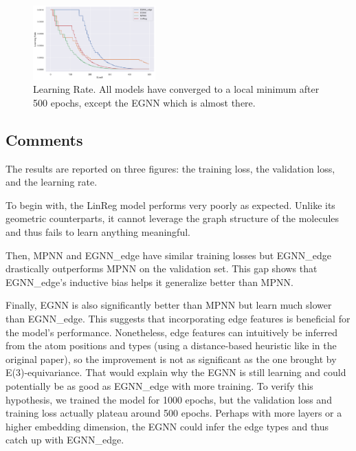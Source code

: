 \documentclass[sigconf]{acmart}
\begin{document}
\begin{figure}
    \centering
    \includegraphics[width=0.42\textwidth]{figures/learning_rate.png}
    \caption{Learning Rate. All models have converged to a local minimum after 500 epochs, except the EGNN which is almost there.}
    \label{fig:learning-rate}
\end{figure}

\subsection{Comments}
The results are reported on three figures: the training loss, the validation loss, and the learning rate.

To begin with, the LinReg model performs very poorly as expected. Unlike its geometric counterparts, it cannot leverage the graph structure of the molecules and thus fails to learn anything meaningful.

Then, MPNN and EGNN\_edge have similar training losses but EGNN\_edge drastically outperforms MPNN on the validation set. This gap shows that EGNN\_edge's inductive bias helps it generalize better than MPNN.

Finally, EGNN is also significantly better than MPNN but learn much slower than EGNN\_edge. This suggests that incorporating edge features is beneficial for the model's performance.
Nonetheless, edge features can intuitively be inferred from the atom positions and types (using a distance-based heuristic like in the original paper), so the improvement is not as significant as the one brought by E(3)-equivariance.
That would explain why the EGNN is still learning and could potentially be as good as EGNN\_edge with more training. To verify this hypothesis, we trained the model for 1000 epochs, but the validation loss and training loss actually plateau around 500 epochs.
Perhaps with more layers or a higher embedding dimension, the EGNN could infer the edge types and thus catch up with EGNN\_edge.




\end{document}
